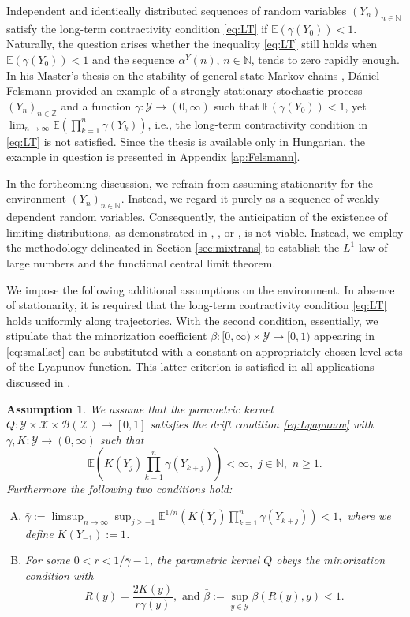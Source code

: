 \documentclass[a4paper,10pt]{article}
\newtheorem{assumption}[theorem]{Assumption}
\newcommand{\N}{\mathbb{N}}
\newcommand{\Z}{\mathbb{Z}}
\newcommand{\B}{\mathcal{B}}
\newcommand{\X}{\mathcal{X}}
\newcommand{\Y}{\mathcal{Y}}
\newcommand{\E}{\mathbb{E}}
\newcommand{\ga}{\gamma}
\begin{document}
\medskip
Independent and identically distributed sequences of random variables $(Y_n)_{n\in\N}$  satisfy the long-term contractivity condition \eqref{eq:LT} if $\E (\ga (Y_0))<1$. Naturally, the question arises whether the inequality \eqref{eq:LT} still holds when $\E (\ga (Y_0))<1$ and the sequence $\alpha^Y (n)$, $n\in\N$, tends to zero rapidly enough. In his Master's thesis on the stability of general state Markov chains \cite{FelsmannThesis}, D\'aniel Felsmann provided an example of a strongly stationary stochastic process $(Y_n)_{n\in\Z}$ and a function $\ga:\Y\to (0,\infty)$ such that $\E (\ga (Y_0))<1$, yet $\lim_{n\to\infty}\E \left(\prod_{k=1}^{n}\ga (Y_k)\right)$, i.e., the long-term contractivity condition in \eqref{eq:LT} is not satisfied. Since the thesis is available only in Hungarian, the example in question is presented in Appendix \ref{ap:Felsmann}.

\medskip
In the forthcoming discussion, we refrain from assuming stationarity for the environment $(Y_n)_{n\in\N}$. Instead, we regard it purely as a sequence of weakly dependent random variables. Consequently, the anticipation of the existence of limiting distributions, as demonstrated in \cite{lovas}, \cite{lovasCLT}, or \cite{Truquet1}, is not viable. Instead, we employ the methodology delineated in Section \ref{sec:mixtrans} to establish the $L^1$-law of large numbers and the functional central limit theorem.

We impose the following additional assumptions on the environment. In absence of stationarity, it is required that the long-term contractivity condition \eqref{eq:LT} holds uniformly along trajectories. With the second condition, essentially, we stipulate that the minorization coefficient $\beta: [0,\infty)\times\Y\to [0,1)$ appearing in \eqref{eq:smallset} can be substituted with a constant on appropriately chosen level sets of the Lyapunov function.  This latter criterion is satisfied in all applications discussed in \cite{lovas}.

\begin{assumption}\label{as:dynamics}
	We assume that the parametric kernel $Q:\Y\times\X\times\B (\X)\to [0,1]$ satisfies the drift condition \eqref{eq:Lyapunov} with $\ga,K:\Y\to (0,\infty)$ such that 
	$$
	\E \left(K(Y_j)\prod_{k=1}^{n}\ga (Y_{k+j})\right)<\infty,
	\,\,j\in\N,\,\, n\ge 1.
	$$
	Furthermore the following two conditions hold:
	\begin{enumerate}[A)]
		\item  
			$\displaystyle{
		\bar{\ga}:=\limsup_{n\to\infty}\sup_{j\ge -1} \E^{1/n}\left(K(Y_j)\prod_{k=1}^{n}\ga (Y_{k+j})\right)<1},
		$ where we define $K(Y_{-1}):=1$.
		
		\item  For some $0<r<1/\bar{\ga}-1$,
		the parametric kernel $Q$ obeys the minorization condition with
		$$R(y)=\frac{2K(y)}{r \ga (y)},\,\, \text{and}
		\,\,
		\bar{\beta}:=\sup_{y\in\Y}\beta \left(R(y),y\right)<1.
		$$
		
	\end{enumerate}

\end{assumption}
\end{document}
